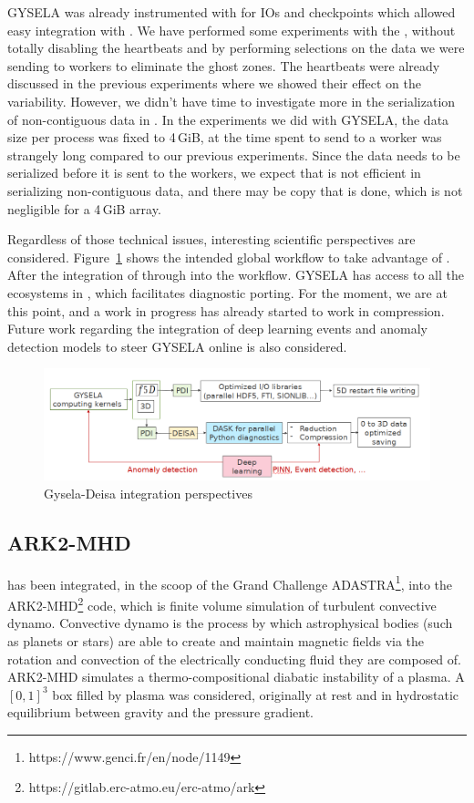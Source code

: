 GYSELA was already instrumented with \pdi for IOs and checkpoints which allowed easy integration with \deisa. We have performed some experiments with the \deisa, without totally disabling the heartbeats and by performing selections on the data we were sending to \dask workers to eliminate the ghost zones. The heartbeats were already discussed in the previous experiments where we showed their effect on the variability. 
However, we didn't have time to investigate more in the serialization of non-contiguous data in \dask.  
In the experiments we did with GYSELA, the data size per process was fixed to 4\,GiB, at the time spent to send to a \dask worker was strangely long compared to our previous experiments. Since the data needs to be serialized before it is sent to the workers, we expect that \dask is not efficient in serializing non-contiguous data, and there may be copy that is done, which is not negligible for a 4\,GiB array.  

Regardless of those technical issues, interesting scientific perspectives are considered. Figure~\ref{fig:gysdeisa} shows the intended global workflow to take advantage of \deisa. After the integration of \deisa through \pdi into the workflow. GYSELA has access to all the ecosystems in \dask, which facilitates diagnostic porting. For the moment, we are at this point, and a work in progress has already started to work in compression. Future work regarding the integration of deep learning events and anomaly detection models to steer GYSELA online is also considered.  

 \begin{figure}[ht]\centering
\includegraphics[scale=0.45]{figures/GyselaDeisa.png}
\caption{Gysela-Deisa integration perspectives~\cite{grandgirard:cea-03740685}}
\label{fig:gysdeisa}
\end{figure}

\subsection{ARK2-MHD}

\deisa has been integrated, in the scoop of the Grand Challenge ADASTRA\footnote{https://www.genci.fr/en/node/1149}, into the ARK2-MHD\footnote{https://gitlab.erc-atmo.eu/erc-atmo/ark} code, which is finite volume simulation of turbulent convective dynamo. Convective dynamo is the process by which astrophysical bodies (such as planets or stars) are able to create and maintain magnetic fields via the rotation and convection of the electrically conducting fluid they are composed of.
ARK2-MHD simulates a thermo-compositional diabatic instability of a plasma. A $[0,1]^3$ box filled by plasma was considered, originally at rest and in hydrostatic equilibrium between gravity and the pressure gradient.

